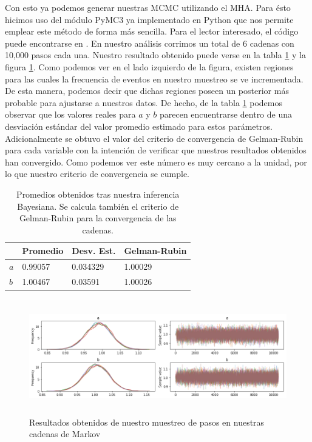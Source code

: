 \documentclass[10.5pt,prb,
               showpacs,            %
               preprintnumbers,     %
               aps,                 %
               prl,          	    %
               letterpaper,             %
               superscriptaddress,      %
               nofootinbib,         %
               tightenlines,        %
               floats,floatfix      %
               ,usenatbib]{revtex4-1}%
\begin{document}
Con esto ya podemos generar nuestras MCMC utilizando el MHA. Para \'esto hicimos uso del 
m\'odulo PyMC3 \cite{PyMC3} ya implementado en Python que nos permite emplear este m\'etodo de forma m\'as sencilla. 
Para el lector interesado, el c\'odigo puede encontrarse en \cite{Github}. En nuestro an\'alisis corrimos un total de 
6 cadenas con 10,000 pasos cada una. Nuestro resultado obtenido puede verse en la tabla \ref{tabla1} y la 
figura \ref{fig:chains}. Como podemos ver en el lado izquierdo de la figura, existen regiones para las cuales 
la frecuencia de eventos en nuestro muestreo se ve incrementada. De esta manera, podemos decir que 
dichas regiones poseen un posterior m\'as probable para ajustarse a nuestros datos. De hecho, de la 
tabla \ref{tabla1} podemos observar que los valores reales para $a$ y $b$ parecen encuentrarse dentro 
de una desviaci\'on est\'andar del valor promedio estimado para estos par\'ametros. Adicionalmente se obtuvo el valor del criterio 
de convergencia de Gelman-Rubin  para cada variable con la intenci\'on de verificar que nuestros resultados 
obtenidos han convergido. Como podemos ver este n\'umero es muy cercano a la unidad, por lo que nuestro 
criterio de convergencia se cumple.
%
\begin{table}[t!]
\centering
\begin{tabular}{||l|l|l|l||} 
 \hline
 & \textbf{Promedio} & \textbf{Desv. Est.} & \textbf{Gelman-Rubin} \\ [0.5ex] 
 \hline\hline
$a$ & 0.99057 & 0.034329 & 1.00029 \\
\hline
$b$ & 1.00467 & 0.03591 & 1.00026\\
\hline
\end{tabular}
\caption{\footnotesize{Promedios obtenidos tras nuestra inferencia Bayesiana. Se calcula tambi\'en el 
criterio de Gelman-Rubin para la convergencia de las cadenas.}}
\label{tabla1}
\end{table}


\begin{figure}[ht] 
\includegraphics[trim = 1mm  1mm 1mm 1mm, clip, width=14.cm, height=5cm]{chain.png}
\caption{Resultados obtenidos de nuestro muestreo de pasos en nuestras cadenas de Markov}%
\label{fig:chains}
\end{figure}
\end{document}
